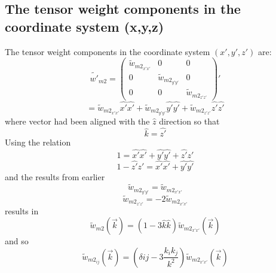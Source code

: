 \documentclass[letterpaper,twocolumn,amsmath,amssymb,prb]{revtex4-1}
\begin{document}
\begin{widetext}
\subsection{The tensor weight components in the coordinate system (x,y,z)}
The tensor weight components in the coordinate system $(x',y',z')$ are:
\begin{equation}{\widetilde{w'}_{m2}=\left(\begin{array}{ccc} \widetilde{w}_{{m2}_{x'x'}} & 0 & 0 \\ 0 & \widetilde{w}_{{m2}_{y'y'}} & 0 \\ 0 & 0 & \widetilde{w}_{{m2}_{z'z'}} \end{array}\right)'}\end{equation}
\begin{displaymath}{=\widetilde{w}_{{m2}_{x'x'}}\hat{x'}\hat{x'}+\widetilde{w}_{{m2}_{y'y'}}\hat{y'}\hat{y'}+\widetilde{w}_{{m2}_{z'z'}}\hat{z'}\hat{z'}}\end{displaymath}
where vector had been aligned with the $\hat{z}$ direction so that 
\begin{equation}{\hat{k}=\hat{z'}}\end{equation}
Using the relation
\begin{displaymath}{1 = \hat{x'}\hat{x'} + \hat{y'}\hat{y'} + \hat{z'}\hat{z'}}\end{displaymath}
\begin{displaymath}{1 -\hat{z'}\hat{z'} = \hat{x'}\hat{x'} + \hat{y'}\hat{y'}}\end{displaymath}
and the results from earlier
\begin{equation}{\widetilde{w}_{{m2}_{y'y'}}=\widetilde{w}_{{m2}_{x'x'}}}\end{equation}
\begin{equation}{\widetilde{w}_{{m2}_{z'z'}}=-2\widetilde{w}_{{m2}_{x'x'}}}\end{equation}
results in
\begin{displaymath}{\widetilde{w}_{m2}(\vec{k})= (1-3\hat{k}\hat{k})\widetilde{w}_{{m2}_{x'x'}}(\vec{k})}\end{displaymath}
and so 
\begin{displaymath}{\widetilde{w}_{m2_{ij}}(\vec{k})= (\delta{ij}-3\frac{k_ik_j}{k^2})\widetilde{w}_{{m2}_{x'x'}}(\vec{k})}\end{displaymath}
\[{}\]


\end{widetext}
\end{document}
